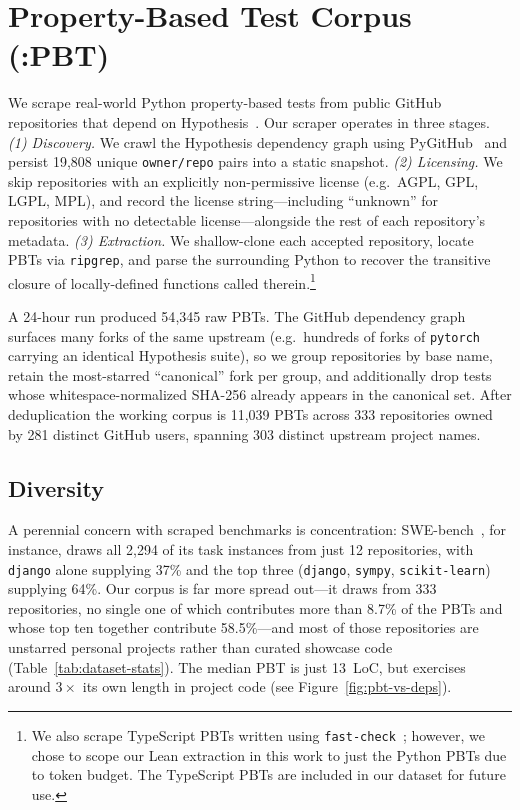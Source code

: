 \section{Property-Based Test Corpus (\FVSpec:PBT)}

We scrape real-world Python property-based tests from public GitHub repositories that depend on Hypothesis~\cite{maciver2019hypothesis}. Our scraper operates in three stages.
\emph{(1) Discovery.} We crawl the Hypothesis dependency graph using PyGitHub~\cite{pygithub} and persist 19{,}808 unique \texttt{owner/repo} pairs into a static snapshot.
\emph{(2) Licensing.} We skip repositories with an explicitly non-permissive license (e.g.\ AGPL, GPL, LGPL, MPL), and record the license string---including ``unknown'' for repositories with no detectable license---alongside the rest of each repository's metadata.
\emph{(3) Extraction.} We shallow-clone each accepted repository, locate PBTs via \texttt{ripgrep}, and parse the surrounding Python to recover the transitive closure of locally-defined functions called therein.\footnote{We also scrape TypeScript PBTs written using \texttt{fast-check}~\cite{fastcheck}; however, we chose to scope our Lean extraction in this work to just the Python PBTs due to token budget. The TypeScript PBTs are included in our dataset for future use.}

A 24-hour run produced 54{,}345 raw PBTs.
The GitHub dependency graph surfaces many forks of the same upstream (e.g.\ hundreds of forks of \texttt{pytorch} carrying an identical Hypothesis suite), so we group repositories by base name, retain the most-starred ``canonical'' fork per group, and additionally drop tests whose whitespace-normalized SHA-256 already appears in the canonical set.
After deduplication the working corpus is 11{,}039 PBTs across 333 repositories owned by 281 distinct GitHub users, spanning 303 distinct upstream project names.

\subsection{Diversity}
\label{sec:dataset-diversity}

A perennial concern with scraped benchmarks is concentration: SWE-bench~\cite{jimenez2024swebench}, for instance, draws all 2{,}294 of its task instances from just 12 repositories, with \texttt{django} alone supplying 37\% and the top three (\texttt{django}, \texttt{sympy}, \texttt{scikit-learn}) supplying 64\%. Our corpus is far more spread out---it draws from 333 repositories, no single one of which contributes more than 8.7\% of the PBTs and whose top ten together contribute 58.5\%---and most of those repositories are unstarred personal projects rather than curated showcase code (Table~\ref{tab:dataset-stats}). The median PBT is just 13~LoC, but exercises around $3\times$ its own length in project code (see Figure~\ref{fig:pbt-vs-deps}).

